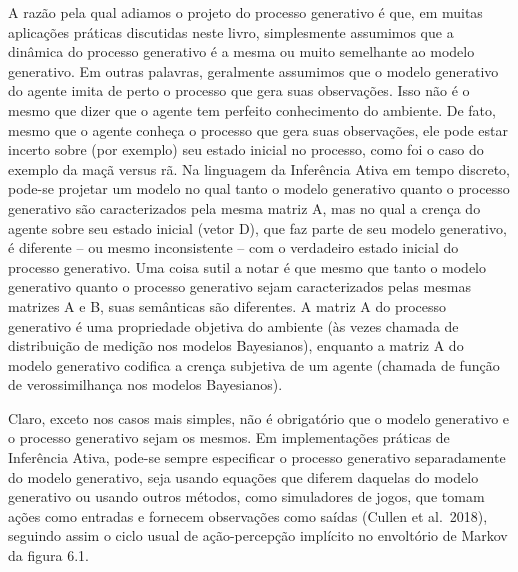 \documentclass[
  12pt,
]{book}
\begin{document}
A razão pela qual adiamos o projeto do processo generativo é que, em muitas aplicações práticas discutidas neste livro, simplesmente assumimos que a dinâmica do processo generativo é a mesma ou muito semelhante ao modelo generativo. Em outras palavras, geralmente assumimos que o modelo generativo do agente imita de perto o processo que gera suas observações. Isso não é o mesmo que dizer que o agente tem perfeito conhecimento do ambiente. De fato, mesmo que o agente conheça o processo que gera suas observações, ele pode estar incerto sobre (por exemplo) seu estado inicial no processo, como foi o caso do exemplo da maçã versus rã. Na linguagem da Inferência Ativa em tempo discreto, pode-se projetar um modelo no qual tanto o modelo generativo quanto o processo generativo são caracterizados pela mesma matriz A, mas no qual a crença do agente sobre seu estado inicial (vetor D), que faz parte de seu modelo generativo, é diferente -- ou mesmo inconsistente -- com o verdadeiro estado inicial do processo generativo. Uma coisa sutil a notar é que mesmo que tanto o modelo generativo quanto o processo generativo sejam caracterizados pelas mesmas matrizes A e B, suas semânticas são diferentes. A matriz A do processo generativo é uma propriedade objetiva do ambiente (às vezes chamada de distribuição de medição nos modelos Bayesianos), enquanto a matriz A do modelo generativo codifica a crença subjetiva de um agente (chamada de função de verossimilhança nos modelos Bayesianos).

Claro, exceto nos casos mais simples, não é obrigatório que o modelo generativo e o processo generativo sejam os mesmos. Em implementações práticas de Inferência Ativa, pode-se sempre especificar o processo generativo separadamente do modelo generativo, seja usando equações que diferem daquelas do modelo generativo ou usando outros métodos, como simuladores de jogos, que tomam ações como entradas e fornecem observações como saídas (Cullen et al.~2018), seguindo assim o ciclo usual de ação-percepção implícito no envoltório de Markov da figura 6.1.
\end{document}
